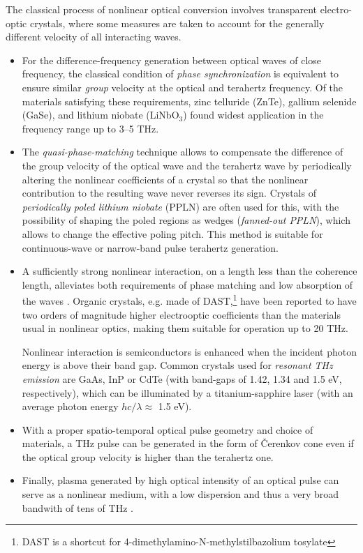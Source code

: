 The classical process of nonlinear optical conversion involves transparent electro-optic crystals, where some measures are taken to account for the generally different velocity of all interacting waves.
\begin{itemize}
	\item{For the difference-frequency generation between optical waves of close frequency, the classical condition of \textit{phase synchronization} is equivalent to ensure similar \textit{group} velocity at the optical and terahertz frequency. Of the materials satisfying these requirements, zinc telluride (ZnTe), gallium selenide (GaSe), and lithium niobate (LiNbO$_{3}$) %
found widest application in the frequency range up to 3--5 THz. } 
\item{The \textit{quasi-phase-matching} technique allows to compensate the difference of the group velocity of the optical wave and the terahertz wave by periodically altering the nonlinear coefficients of a crystal so that the nonlinear contribution to the resulting wave never reverses its sign. Crystals of \textit{periodically poled lithium niobate} (PPLN) are often used for this, with the possibility of shaping the poled regions as wedges (\textit{fanned-out PPLN}), which allows to change the effective poling pitch. This method is suitable for continuous-wave or narrow-band pulse terahertz generation.  }  %
\item{A sufficiently strong nonlinear interaction, on a length less than the coherence length, alleviates both requirements of phase matching and low absorption of the waves \cite{leitenstorfer1999detectors}. Organic crystals, e.g. made of DAST,\footnote{DAST is a shortcut for 4-dimethylamino-N-methylstilbazolium tosylate}
have been reported \cite{han2000use} %
to have two orders of magnitude higher electrooptic coefficients than the materials usual in nonlinear optics, making them suitable for operation up to 20 THz. 

Nonlinear interaction is semiconductors is enhanced when the incident photon energy is above their band gap. Common crystals used for \textit{resonant THz emission} are GaAs, %
InP  or CdTe (with band-gaps of 1.42, 1.34 and 1.5 eV, respectively), which can be illuminated by a titanium-sapphire laser (with an average photon energy $hc/\lambda \approx$ 1.5 eV).} 
\item{With a proper spatio-temporal optical pulse geometry and choice of materials,\cite{auston1984cherenkov} a THz pulse can be generated in the form of Čerenkov cone even if the optical group velocity is higher than the terahertz one.}
\item{Finally, plasma generated by high optical intensity of an optical pulse can serve as a nonlinear medium, with a low dispersion and thus a very broad bandwith of tens of THz \cite{loffler2000generation,chen2007terahertz,tong2012}. }
 \end{itemize}

